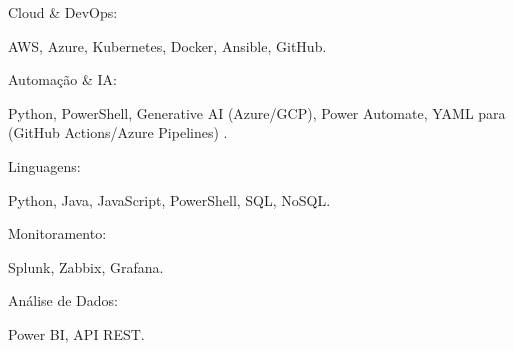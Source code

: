 

\begin{cventries}

  \cventry
    {} %
    {Cloud \& DevOps:} %
    {} %
    {} %
    {
      \begin{cvitems} %
        \item {AWS, Azure, Kubernetes, Docker, Ansible, GitHub.}
      \end{cvitems}
    }

  \cventry
    {} %
    {Automação \& IA:} %
    {} %
    {} %
    {
      \begin{cvitems} %
        \item {Python, PowerShell, Generative AI (Azure/GCP), Power Automate, YAML para (GitHub Actions/Azure Pipelines) .}
      \end{cvitems}
    }

  \cventry
    {} %
    {Linguagens:} %
    {} %
    {} %
    {
      \begin{cvitems} %
        \item {Python, Java, JavaScript, PowerShell, SQL, NoSQL.}
      \end{cvitems}
    }

  \cventry
    {} %
    {Monitoramento:} %
    {} %
    {} %
    {
      \begin{cvitems} %
        \item {Splunk, Zabbix, Grafana.}
      \end{cvitems}
    }

  \cventry
    {} %
    {Análise de Dados:} %
    {} %
    {} %
    {
      \begin{cvitems} %
        \item {Power BI, API REST.}
      \end{cvitems}
    }


\end{cventries}
